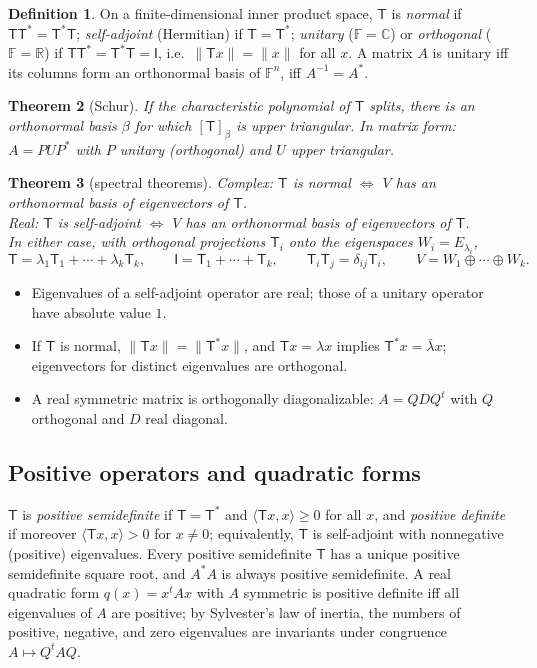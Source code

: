 \documentclass[12pt]{article}
\newtheorem{theorem}{Theorem}[section]
\theoremstyle{definition}
\newtheorem{definition}[theorem]{Definition}
\theoremstyle{remark}
\newcommand{\F}{\mathbb{F}}
\newcommand{\R}{\mathbb{R}}
\newcommand{\C}{\mathbb{C}}
\newcommand{\T}{\mathsf{T}}
\newcommand{\I}{\mathsf{I}}
\newcommand{\ip}[2]{\langle #1,#2\rangle}
\newcommand{\norm}[1]{\lVert #1\rVert}
\begin{document}
\begin{definition}
On a finite-dimensional inner product space, $\T$ is \emph{normal} if $\T\T^*=\T^*\T$; \emph{self-adjoint} (Hermitian) if $\T=\T^*$;
\emph{unitary} ($\F=\C$) or \emph{orthogonal} ($\F=\R$) if $\T\T^*=\T^*\T=\I$, i.e.\ $\norm{\T x}=\norm{x}$ for all $x$.
A matrix $A$ is unitary iff its columns form an orthonormal basis of $\F^n$, iff $A^{-1}=A^*$.
\end{definition}

\begin{theorem}[Schur]
If the characteristic polynomial of $\T$ splits, there is an orthonormal basis $\beta$ for which $[\T]_\beta$ is upper triangular.
In matrix form: $A=PUP^*$ with $P$ unitary (orthogonal) and $U$ upper triangular.
\end{theorem}

\begin{theorem}[spectral theorems]
\emph{Complex:} $\T$ is normal $\iff$ $V$ has an orthonormal basis of eigenvectors of $\T$.\\
\emph{Real:} $\T$ is self-adjoint $\iff$ $V$ has an orthonormal basis of eigenvectors of $\T$.\\
In either case, with orthogonal projections $\T_i$ onto the eigenspaces $W_i=E_{\lambda_i}$,
\[
\T=\lambda_1\T_1+\cdots+\lambda_k\T_k,\qquad \I=\T_1+\cdots+\T_k,\qquad \T_i\T_j=\delta_{ij}\T_i,\qquad V=W_1\oplus\cdots\oplus W_k .
\]
\end{theorem}

\begin{itemize}
  \item Eigenvalues of a self-adjoint operator are real; those of a unitary operator have absolute value $1$.
  \item If $\T$ is normal, $\norm{\T x}=\norm{\T^*x}$, and $\T x=\lambda x$ implies $\T^*x=\bar\lambda x$;
        eigenvectors for distinct eigenvalues are orthogonal.
  \item A real symmetric matrix is orthogonally diagonalizable: $A=QDQ^{t}$ with $Q$ orthogonal and $D$ real diagonal.
\end{itemize}

\subsection{Positive operators and quadratic forms}
$\T$ is \emph{positive semidefinite} if $\T=\T^*$ and $\ip{\T x}{x}\ge0$ for all $x$, and \emph{positive definite} if moreover
$\ip{\T x}{x}>0$ for $x\neq0$; equivalently, $\T$ is self-adjoint with nonnegative (positive) eigenvalues. Every positive
semidefinite $\T$ has a unique positive semidefinite square root, and $A^*A$ is always positive semidefinite.
A real quadratic form $q(x)=x^tAx$ with $A$ symmetric is positive definite iff all eigenvalues of $A$ are positive; by
Sylvester's law of inertia, the numbers of positive, negative, and zero eigenvalues are invariants under congruence $A\mapsto Q^tAQ$.
\end{document}
